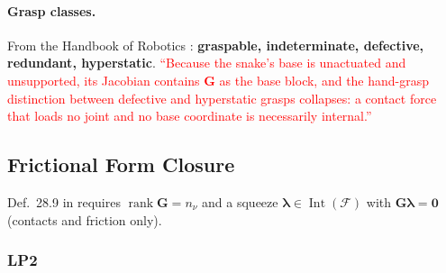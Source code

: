 \paragraph{Grasp classes.}
From the Handbook of Robotics \cite{prattichizzo2008grasping}:
\textbf{graspable, indeterminate, defective, redundant, hyperstatic}.
\textcolor{red}{``Because the snake's base is unactuated and unsupported, its
Jacobian contains $\boldsymbol{G}$ as the base block, and the hand-grasp
distinction between defective and hyperstatic grasps collapses: a contact
force that loads no joint and no base coordinate is necessarily internal.''}

\subsection{Frictional Form Closure}
\label{sec:frictional-form-closure}

Def.~28.9 in \cite{prattichizzo2008grasping} requires
$\operatorname{rank}\boldsymbol{G} = n_\nu$ and a squeeze
$\boldsymbol{\lambda} \in \operatorname{Int}(\mathcal{F})$ with
$\boldsymbol{G}\boldsymbol{\lambda} = \mathbf{0}$ (contacts and friction
only).

\subsubsection{LP2}
\label{sec:lp2}


